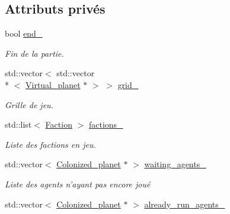 \subsection*{Attributs privés}
\begin{DoxyCompactItemize}
\item 
\hypertarget{classWorld_a5773dad1dda0f5380a5f65c94f57de9c}{bool \hyperlink{classWorld_a5773dad1dda0f5380a5f65c94f57de9c}{end\-\_\-}}\label{classWorld_a5773dad1dda0f5380a5f65c94f57de9c}

\begin{DoxyCompactList}\small\item\em Fin de la partie. \end{DoxyCompactList}\item 
\hypertarget{classWorld_a46afecbf41a86494f6e48dad3d4a3247}{std\-::vector$<$ std\-::vector\\*
$<$ \hyperlink{classVirtual__planet}{Virtual\-\_\-planet} $\ast$ $>$ $>$ \hyperlink{classWorld_a46afecbf41a86494f6e48dad3d4a3247}{grid\-\_\-}}\label{classWorld_a46afecbf41a86494f6e48dad3d4a3247}

\begin{DoxyCompactList}\small\item\em Grille de jeu. \end{DoxyCompactList}\item 
\hypertarget{classWorld_a9e4a76505c85cae1329f6083011e9be5}{std\-::list$<$ \hyperlink{classFaction}{Faction} $>$ \hyperlink{classWorld_a9e4a76505c85cae1329f6083011e9be5}{factions\-\_\-}}\label{classWorld_a9e4a76505c85cae1329f6083011e9be5}

\begin{DoxyCompactList}\small\item\em Liste des factions en jeu. \end{DoxyCompactList}\item 
std\-::vector$<$ \hyperlink{classColonized__planet}{Colonized\-\_\-planet} $\ast$ $>$ \hyperlink{classWorld_a732ce05c7e0012b98e2a8715b41d89fd}{waiting\-\_\-agents\-\_\-}
\begin{DoxyCompactList}\small\item\em Liste des agents n'ayant pas encore joué \end{DoxyCompactList}\item 
\hypertarget{classWorld_aafbe82365fac0f0d0e98c95d33a258f9}{std\-::vector$<$ \hyperlink{classColonized__planet}{Colonized\-\_\-planet} $\ast$ $>$ \hyperlink{classWorld_aafbe82365fac0f0d0e98c95d33a258f9}{already\-\_\-run\-\_\-agents\-\_\-}}\label{classWorld_aafbe82365fac0f0d0e98c95d33a258f9}


\end{DoxyCompactItemize}
